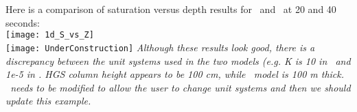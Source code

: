     Here is a comparison of saturation versus depth results for  \mfus\ and \hgs\ at 20 and 40 seconds:
    \vspace{.2in} \\
    \texttt{[image: 1d\_S\_vs\_Z]}
    \vspace{.2in} \\

\texttt{[image: UnderConstruction]} \textit{
Although these results look good, there is a discrepancy between the unit systems used in the two models (e.g. K is 10 in \hgs\ and 1e-5 in \mfus.   HGS column height appears to be 100 cm, while \mfus\ model is 100 m thick.
\mut\ needs to be modified to allow the user to change unit systems and then we should update this example.
}





